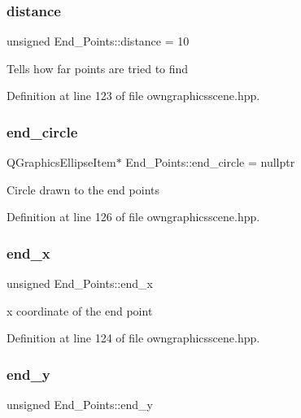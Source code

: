\subsubsection{\texorpdfstring{distance}{distance}}
{\footnotesize\ttfamily unsigned End\+\_\+\+Points\+::distance = 10}

Tells how far points are tried to find 

Definition at line 123 of file owngraphicsscene.\+hpp.

\mbox{\label{structEnd__Points_abf301947140c1584823b50071c7b8ee6}} 
\subsubsection{\texorpdfstring{end\+\_\+circle}{end\_circle}}
{\footnotesize\ttfamily Q\+Graphics\+Ellipse\+Item$\ast$ End\+\_\+\+Points\+::end\+\_\+circle = nullptr}

Circle drawn to the end points 

Definition at line 126 of file owngraphicsscene.\+hpp.

\mbox{\label{structEnd__Points_a2b33a99792ec437e7c2369ceaf435176}} 
\subsubsection{\texorpdfstring{end\+\_\+x}{end\_x}}
{\footnotesize\ttfamily unsigned End\+\_\+\+Points\+::end\+\_\+x}

x coordinate of the end point 

Definition at line 124 of file owngraphicsscene.\+hpp.

\mbox{\label{structEnd__Points_a04207ee9a97ee6d785b493305cd9e7e8}} 
\subsubsection{\texorpdfstring{end\+\_\+y}{end\_y}}
{\footnotesize\ttfamily unsigned End\+\_\+\+Points\+::end\+\_\+y}

